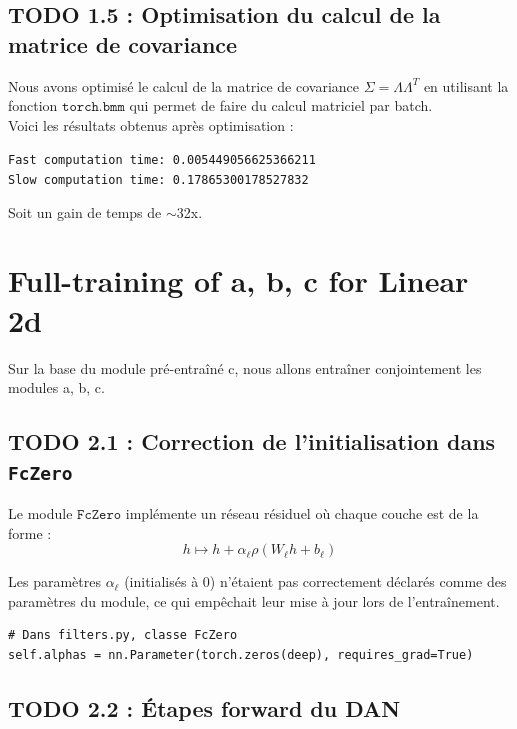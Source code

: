 \documentclass[12pt,a4paper]{article}
\begin{document}
\subsection*{TODO 1.5 : Optimisation du calcul de la matrice de covariance}

Nous avons optimisé le calcul de la matrice de covariance $\Sigma = \Lambda \Lambda^T$ en utilisant la fonction $\texttt{torch.bmm}$ qui permet de faire du calcul matriciel par batch. \\
Voici les résultats obtenus après optimisation :
\begin{tcolorbox}[colback=gray!10, colframe=gray!80, sharp corners, boxrule=0.5pt]
\small
\texttt{Fast computation time:  0.005449056625366211} \\
\texttt{Slow computation time:  0.17865300178527832}
\end{tcolorbox}

Soit un gain de temps de $\sim$32x. \\


\section{Full-training of a, b, c for Linear 2d}

Sur la base du module pré-entraîné c, nous allons entraîner conjointement les modules a, b, c.


\subsection*{TODO 2.1 : Correction de l'initialisation dans \texttt{FcZero}}

Le module $\texttt{FcZero}$ implémente un réseau résiduel où chaque couche est de la forme :
$$
h \mapsto h + \alpha_\ell \rho(W_\ell h + b_\ell)
$$

Les paramètres $\alpha_\ell$ (initialisés à 0) n'étaient pas correctement déclarés comme des paramètres du module, ce qui empêchait leur mise à jour lors de l'entraînement. \\

\begin{lstlisting}
# Dans filters.py, classe FcZero
self.alphas = nn.Parameter(torch.zeros(deep), requires_grad=True)
\end{lstlisting}

\vspace{0.5cm}


\subsection*{TODO 2.2 : Étapes forward du DAN}
\end{document}
